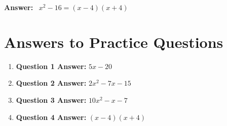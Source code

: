 \documentclass[12pt]{article}
\begin{document}
\textbf{Answer:} \ \(x^2 - 16 = (x - 4)(x + 4)\)

\section*{Answers to Practice Questions}
\begin{enumerate}
    \item \textbf{Question 1 Answer:} \(5x - 20\)
    \item \textbf{Question 2 Answer:} \(2x^2 - 7x - 15\)
    \item \textbf{Question 3 Answer:} \(10x^2 - x - 7\)
    \item \textbf{Question 4 Answer:} \((x - 4)(x + 4)\)
\end{enumerate}
\end{document}
